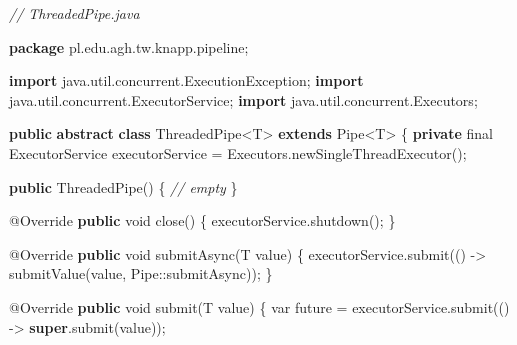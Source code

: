 \documentclass[11pt]{article}
\newenvironment{Shaded}{}{}
\newcommand{\KeywordTok}[1]{\textcolor[rgb]{0.00,0.44,0.13}{\textbf{{#1}}}}
\newcommand{\DataTypeTok}[1]{\textcolor[rgb]{0.56,0.13,0.00}{{#1}}}
\newcommand{\CommentTok}[1]{\textcolor[rgb]{0.38,0.63,0.69}{\textit{{#1}}}}
\newcommand{\FunctionTok}[1]{\textcolor[rgb]{0.02,0.16,0.49}{{#1}}}
\newcommand{\NormalTok}[1]{{#1}}
\newcommand{\ImportTok}[1]{{#1}}
\newcommand{\OperatorTok}[1]{\textcolor[rgb]{0.40,0.40,0.40}{{#1}}}
\newcommand{\BuiltInTok}[1]{{#1}}
\newcommand{\AttributeTok}[1]{\textcolor[rgb]{0.49,0.56,0.16}{{#1}}}
\begin{document}
\begin{Shaded}
\begin{Highlighting}[]
\CommentTok{// ThreadedPipe.java}

\KeywordTok{package}\ImportTok{ pl}\OperatorTok{.}\ImportTok{edu}\OperatorTok{.}\ImportTok{agh}\OperatorTok{.}\ImportTok{tw}\OperatorTok{.}\ImportTok{knapp}\OperatorTok{.}\ImportTok{pipeline}\OperatorTok{;}

\KeywordTok{import} \ImportTok{java}\OperatorTok{.}\ImportTok{util}\OperatorTok{.}\ImportTok{concurrent}\OperatorTok{.}\ImportTok{ExecutionException}\OperatorTok{;}
\KeywordTok{import} \ImportTok{java}\OperatorTok{.}\ImportTok{util}\OperatorTok{.}\ImportTok{concurrent}\OperatorTok{.}\ImportTok{ExecutorService}\OperatorTok{;}
\KeywordTok{import} \ImportTok{java}\OperatorTok{.}\ImportTok{util}\OperatorTok{.}\ImportTok{concurrent}\OperatorTok{.}\ImportTok{Executors}\OperatorTok{;}

\KeywordTok{public} \KeywordTok{abstract} \KeywordTok{class}\NormalTok{ ThreadedPipe}\OperatorTok{\textless{}}\NormalTok{T}\OperatorTok{\textgreater{}} \KeywordTok{extends} \BuiltInTok{Pipe}\OperatorTok{\textless{}}\NormalTok{T}\OperatorTok{\textgreater{}} \OperatorTok{\{}
    \KeywordTok{private} \DataTypeTok{final} \BuiltInTok{ExecutorService}\NormalTok{ executorService }\OperatorTok{=} \BuiltInTok{Executors}\OperatorTok{.}\FunctionTok{newSingleThreadExecutor}\OperatorTok{();}

    \KeywordTok{public} \FunctionTok{ThreadedPipe}\OperatorTok{()} \OperatorTok{\{}
        \CommentTok{// empty}
    \OperatorTok{\}}

    \AttributeTok{@Override}
    \KeywordTok{public} \DataTypeTok{void} \FunctionTok{close}\OperatorTok{()} \OperatorTok{\{}
\NormalTok{        executorService}\OperatorTok{.}\FunctionTok{shutdown}\OperatorTok{();}
    \OperatorTok{\}}

    \AttributeTok{@Override}
    \KeywordTok{public} \DataTypeTok{void} \FunctionTok{submitAsync}\OperatorTok{(}\NormalTok{T value}\OperatorTok{)} \OperatorTok{\{}
\NormalTok{        executorService}\OperatorTok{.}\FunctionTok{submit}\OperatorTok{(()} \OperatorTok{{-}\textgreater{}} \FunctionTok{submitValue}\OperatorTok{(}\NormalTok{value}\OperatorTok{,} \BuiltInTok{Pipe}\OperatorTok{::}\NormalTok{submitAsync}\OperatorTok{));}
    \OperatorTok{\}}

    \AttributeTok{@Override}
    \KeywordTok{public} \DataTypeTok{void} \FunctionTok{submit}\OperatorTok{(}\NormalTok{T value}\OperatorTok{)} \OperatorTok{\{}
        \DataTypeTok{var}\NormalTok{ future }\OperatorTok{=}\NormalTok{ executorService}\OperatorTok{.}\FunctionTok{submit}\OperatorTok{(()} \OperatorTok{{-}\textgreater{}} \KeywordTok{super}\OperatorTok{.}\FunctionTok{submit}\OperatorTok{(}\NormalTok{value}\OperatorTok{));}


\end{Highlighting}
\end{Shaded}
\end{document}
